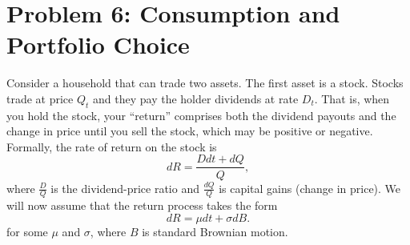 \documentclass[11pt]{extarticle}
\theoremstyle{plain}
\theoremstyle{definition}
\begin{document}
% 
% 
% 
% 



\vspace{5mm}
\section*{Problem 6: Consumption and Portfolio Choice}

Consider a household that can trade two assets. The first asset is a stock. Stocks trade at price $Q_t$ and they pay the holder dividends at rate $D_t$. That is, when you hold the stock, your ``return'' comprises both the dividend payouts and the change in price until you sell the stock, which may be positive or negative. Formally, the rate of return on the stock is 
\begin{equation*}
	dR = \frac{D dt + dQ}{Q}, 
\end{equation*}
where $\frac{D}{Q}$ is the dividend-price ratio and $\frac{dQ}{Q}$ is capital gains (change in price). We will now assume that the return process takes the form  
\begin{equation*}
	d R = \mu dt + \sigma dB.
\end{equation*}
for some $\mu$ and $\sigma$, where $B$ is standard Brownian motion. 
\end{document}
